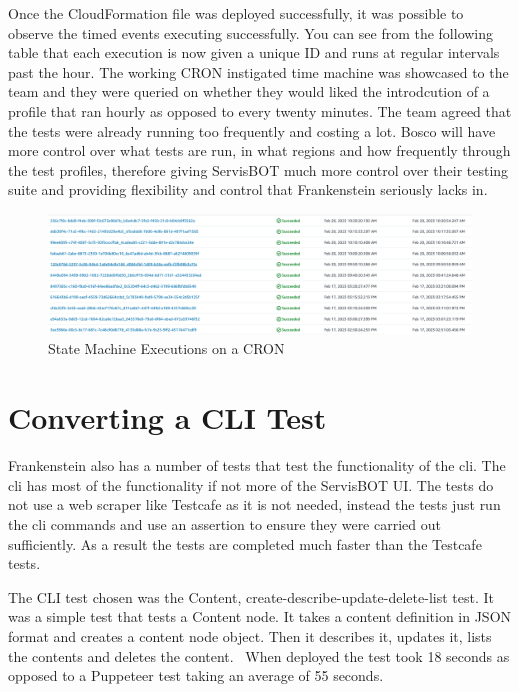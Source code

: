 \documentclass[12pt,a4paper,titlepage]{report}
\begin{document}
Once the  CloudFormation file was deployed successfully, it was possible to observe the timed events executing successfully. You can see from the following table 
that each execution is now given a unique ID and runs at regular intervals past the hour. The working CRON instigated time machine was showcased to the team and they were 
queried on whether they would liked the introdcution of a profile that ran hourly as opposed to every twenty minutes. The team agreed that the tests were already running too 
frequently and costing a lot. Bosco will have more control over what tests are run, in what regions and how frequently through the test profiles, therefore giving ServisBOT 
much more control over their testing suite and providing flexibility and control that Frankenstein seriously lacks in.

\begin{figure}[ht]
  \centering
  \includegraphics[width=15cm]{./diagrams/state_machine_cron_executions.png}
  \caption{State Machine Executions on a CRON }
 \end{figure}

 \section{Converting a CLI Test}
 Frankenstein also has a number of tests that test the functionality of the cli. The cli has most of the functionality if not more of the ServisBOT UI. The tests do not use a web scraper like Testcafe as it is not needed, instead the tests just run the cli commands and use an assertion to ensure they were carried out sufficiently. As a result the tests are completed much faster than the Testcafe tests.

The CLI test chosen was the Content, create-describe-update-delete-list test. It was a simple test that tests a Content node. It takes a content definition in JSON format and creates a content node object. Then it describes it, updates it, lists the contents and deletes the content. 
When deployed the test took 18 seconds as opposed to a Puppeteer test taking an average of 55 seconds.
\end{document}

